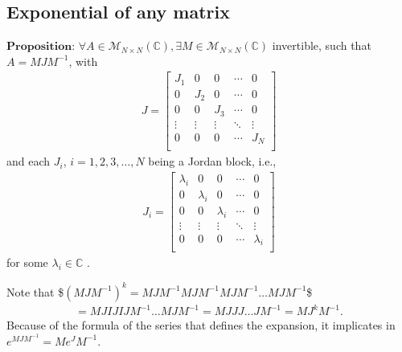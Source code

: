 \documentclass[letterpaper,10pt,english]{jupyterBook}
\begin{document}
\subsection{Exponential of any matrix}
\label{\detokenize{appendix:exponential-of-any-matrix}}
\sphinxAtStartPar
\(\textbf{Proposition: } \forall A \in \mathscr{M}_{N \times N}(\mathbb{C}), \exists M \in \mathscr{M}_{N \times N}(\mathbb{C})\) invertible, such that \(A = MJM^{-1}\), with
\begin{equation*}
\begin{split} 
J = \left[ {\begin{array}{ccccc}
    J_1 & 0 & 0 & \dotsm & 0\\
    0 & J_2 & 0 & \dotsm & 0\\
    0 & 0 & J_3 & \dotsm & 0\\
    \vdots & \vdots & \vdots & \ddots & \vdots\\
    0 & 0 & 0 & \dotsm & J_{N}\\
\end{array} } \right]
\end{split}
\end{equation*}
\sphinxAtStartPar
and each \(J_i\), \(i = 1, 2, 3, \dotsc, N\) being a Jordan block, i.e.,
\begin{equation*}
\begin{split}
J_i = \left[ {\begin{array}{ccccc}
    \lambda_i & 0 & 0 & \dotsm & 0\\
    0 & \lambda_i & 0 & \dotsm & 0\\
    0 & 0 & \lambda_i & \dotsm & 0\\
    \vdots & \vdots & \vdots & \ddots & \vdots\\
    0 & 0 & 0 & \dotsm & \lambda_i\\
\end{array} } \right]
\end{split}
\end{equation*}
\sphinxAtStartPar
for some \(\lambda_i \in \mathbb{C}\) .

\sphinxAtStartPar
Note that
\$\(
    (MJM^{-1})^k = MJM^{-1}MJM^{-1}MJM^{-1} \dotsc MJM^{-1} 
\)\$
\begin{equation*}
\begin{split}
    = MJIJIJM^{-1} \dotsc MJM^{-1} = MJJJ \dotsc JM^{-1} = MJ^kM^{-1}.
\end{split}
\end{equation*}
\sphinxAtStartPar
Because of the formula of the series that defines the expansion, it implicates in \(e^{MJM^{-1}} = M e^J M^{-1}\).
\end{document}
